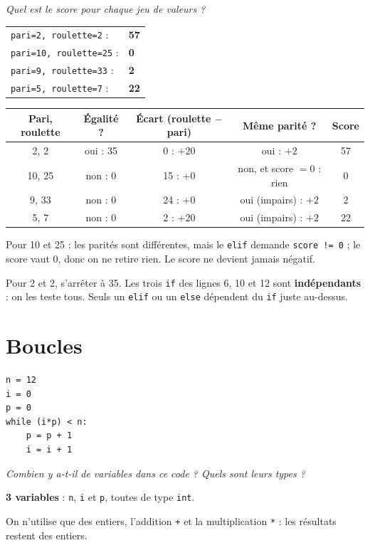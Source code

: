 \documentclass[addpoints, 11pt]{exam}
\newcommand{\enonce}[1]{\textit{#1}\par\smallskip}
\newcommand{\code}[1]{\texttt{#1}}
\DeclareRobustCommand{\_}{\textunderscore\allowbreak}
\begin{document}
\begin{questions}
\question[2] \enonce{Quel est le score pour chaque jeu de valeurs ?}
\begin{reponse}
\begin{tabular}{ll}
\code{pari=2, roulette=2} : & \textbf{57}\\
\code{pari=10, roulette=25} : & \textbf{0}\\
\code{pari=9, roulette=33} : & \textbf{2}\\
\code{pari=5, roulette=7} : & \textbf{22}\\
\end{tabular}
\end{reponse}
\begin{center}
\small
\begin{tabular}{|c|c|c|c|c|}
\hline
Pari, roulette & Égalité ? & Écart (roulette $-$ pari) & Même parité ? & Score \\ \hline
2, 2 & oui : 35 & 0 : $+20$ & oui : $+2$ & 57 \\
10, 25 & non : 0 & 15 : $+0$ & non, et score $= 0$ : rien & 0 \\
9, 33 & non : 0 & 24 : $+0$ & oui (impairs) : $+2$ & 2 \\
5, 7 & non : 0 & 2 : $+20$ & oui (impairs) : $+2$ & 22 \\ \hline
\end{tabular}
\end{center}
Pour 10 et 25 : les parités sont différentes, mais le \code{elif} demande \code{score != 0} ; le score vaut 0, donc on ne retire rien. Le score ne devient jamais négatif.

\begin{erreur}
Pour 2 et 2, s'arrêter à 35. Les trois \code{if} des lignes 6, 10 et 12 sont \textbf{indépendants} : on les teste tous. Seuls un \code{elif} ou un \code{else} dépendent du \code{if} juste au-dessus.
\end{erreur}

\section{Boucles}

\begin{lstlisting}
n = 12
i = 0
p = 0
while (i*p) < n:
    p = p + 1
    i = i + 1
\end{lstlisting}

\question[1] \enonce{Combien y a-t-il de variables dans ce code ? Quels sont leurs types ?}
\begin{reponse}
\textbf{3 variables} : \code{n}, \code{i} et \code{p}, toutes de type \code{int}.
\end{reponse}
On n'utilise que des entiers, l'addition \code{+} et la multiplication \code{*} : les résultats restent des entiers.


\end{questions}
\end{document}
